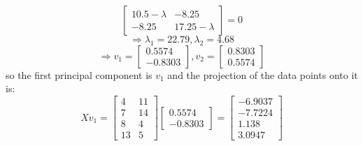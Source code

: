 \begin{qsolve}
\begin{qsolve}[]
$$\begin{bmatrix}
            10.5-\lambda & -8.25\\
            -8.25 & 17.25-\lambda
        \end{bmatrix} = 0$$
        $$\Rightarrow \lambda_1 = 22.79, \lambda_2 = 4.68$$
        $$\Rightarrow v_1 = \begin{bmatrix}
            0.5574\\ 
            -0.8303
        \end{bmatrix}, v_2 = \begin{bmatrix}
            0.8303\\ 
            0.5574
        \end{bmatrix}$$
        so the first principal component is $v_1$ and the projection of the data points onto it is:
        $$Xv_1 = \begin{bmatrix}
            4 & 11\\
            7 & 14\\
            8 & 4\\
            13 & 5
            \end{bmatrix}\begin{bmatrix}
            0.5574\\ 
            -0.8303
        \end{bmatrix} = \begin{bmatrix}
            -6.9037\\
            -7.7224\\
            1.138\\
            3.0947
        \end{bmatrix}$$
    \end{qsolve}
\end{qsolve}